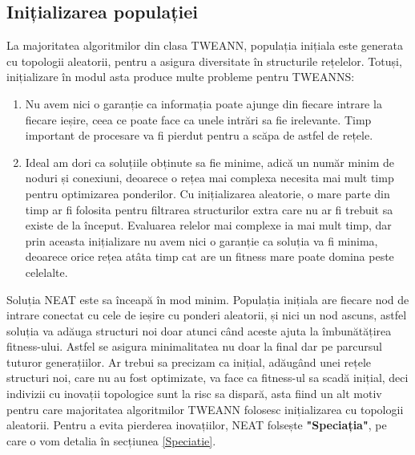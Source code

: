 \subsection{Inițializarea populației}\label{InitializareNeat}
La majoritatea algoritmilor din clasa TWEANN, populația inițiala este generata cu topologii aleatorii, pentru a asigura diversitate în structurile rețelelor. Totuși, inițializare în modul asta produce multe probleme pentru TWEANNS:
\begin{enumerate}
    \item Nu avem nici o garanție ca informația poate ajunge din fiecare intrare la fiecare ieșire, ceea ce poate face ca unele intrări sa fie irelevante. Timp important de procesare va fi pierdut pentru a scăpa de astfel de rețele.
    \item Ideal am dori ca soluțiile obținute sa fie minime, adică un număr minim de noduri și conexiuni, deoarece o rețea mai complexa necesita mai mult timp pentru optimizarea ponderilor. Cu inițializarea aleatorie, o mare parte din timp ar fi folosita pentru filtrarea structurilor extra care nu ar fi trebuit sa existe de la început. Evaluarea relelor mai complexe ia mai mult timp, dar prin aceasta inițializare nu avem nici o garanție ca soluția va fi minima, deoarece orice rețea atâta timp cat are un fitness mare poate domina peste celelalte.
\end{enumerate}

Soluția NEAT este sa înceapă în mod minim. Populația inițiala are fiecare nod de intrare conectat cu cele de ieșire cu ponderi aleatorii, și nici un nod ascuns, astfel soluția va adăuga structuri noi doar atunci când aceste ajuta la îmbunătățirea fitness-ului. Astfel se asigura minimalitatea nu doar la final dar pe parcursul tuturor generațiilor. Ar trebui sa precizam ca inițial, adăugând unei rețele structuri noi, care nu au fost optimizate, va face ca fitness-ul sa scadă inițial, deci indivizii cu inovații topologice sunt la risc sa dispară, asta fiind un alt motiv pentru care majoritatea algoritmilor TWEANN folosesc inițializarea cu topologii aleatorii. Pentru a evita pierderea inovațiilor, NEAT folsește \textbf{"Speciația"}, pe care o vom detalia în secțiunea \ref{Speciatie}.

